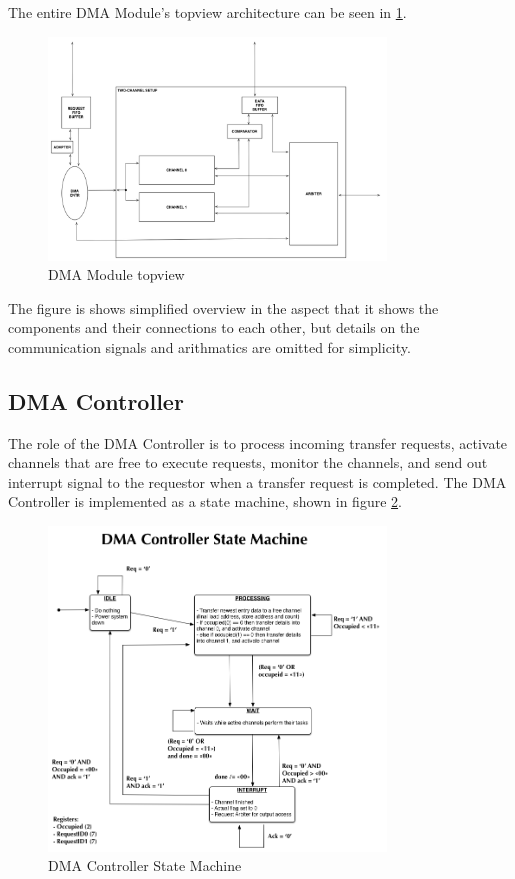 The entire DMA Module's topview architecture can be seen in 
\ref{fig:DMATopView}.

\begin{figure}[h!]
    \centering
    \includegraphics[width=0.8\textwidth]{Figures/DMA/TopViewFinalSimple}
    \caption{DMA Module topview}
    \label{fig:DMATopView}
\end{figure}

The figure is shows simplified overview in the aspect that it shows the components and their connections to each other, but details on the communication signals and arithmatics are omitted for simplicity. 

\subsection{DMA Controller}
The role of the DMA Controller is to process incoming transfer requests, activate channels that are free to execute requests, monitor the channels, and send out interrupt signal to the requestor when a transfer request is completed. 
The DMA Controller is implemented as a state machine, shown in figure \ref{fig:DMAControllerStateMachine}.

\begin{figure}[h!]
    \centering
    \includegraphics[width=0.8\textwidth]{Figures/DMA/StateMachineFinal}
    \caption{DMA Controller State Machine}
    \label{fig:DMAControllerStateMachine}
\end{figure}

